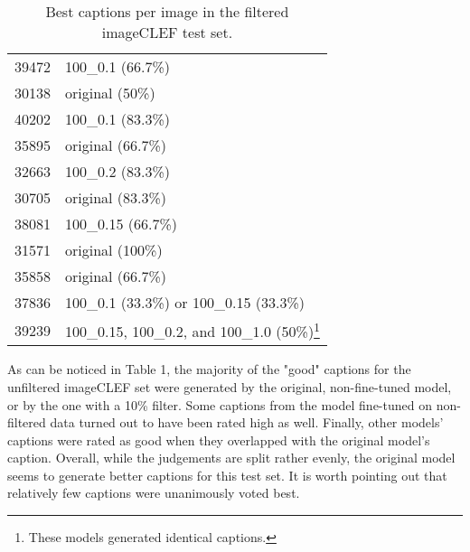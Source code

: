 \documentclass[11pt]{article}
\begin{document}
\begin{table}[h]
\begin{center}
\begin{tabular}{|p{1cm}|p{4.5cm}|}
            39472            & 100\_0.1 (66.7\%)                                                                             \\
            30138            & original (50\%)                                                                               \\
            40202            & 100\_0.1 (83.3\%)                                                                             \\
            35895            & original (66.7\%)                                                                             \\
            32663            & 100\_0.2 (83.3\%)                                                                             \\
            30705            & original (83.3\%)                                                                             \\
            38081            & 100\_0.15 (66.7\%)                                                                            \\
            31571            & original (100\%)                                                                              \\
            35858            & original (66.7\%)                                                                             \\
            37836            & 100\_0.1 (33.3\%) or 100\_0.15 (33.3\%)                                                       \\
            39239            & 100\_0.15, 100\_0.2, and 100\_1.0 (50\%)\footnote{These models generated identical captions.} \\
            \hline
        \end{tabular}
    \end{center}
    \caption{\label{filtered-table} Best captions per image in the filtered imageCLEF test set. }
\end{table}

As can be noticed in Table 1, the majority of the "good" captions for the unfiltered imageCLEF set were generated by the original, non-fine-tuned model, or by the one with a 10\% filter. Some captions from the model fine-tuned on non-filtered data turned out to have been rated high as well. Finally, other models' captions were rated as good when they overlapped with the original model's caption. Overall, while the judgements are split rather evenly, the original model seems to generate better captions for this test set. It is worth pointing out that relatively few captions were unanimously voted best.
\end{document}
